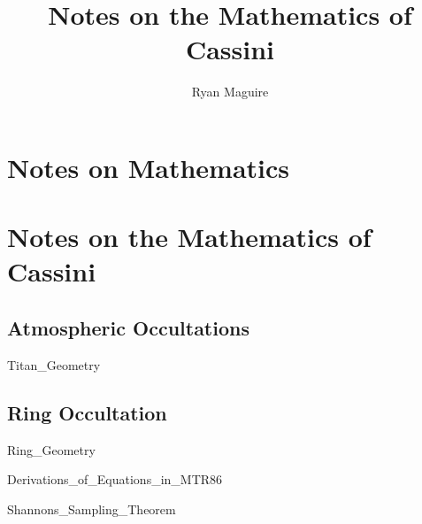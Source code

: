\documentclass[crop=false,class=book,oneside]{standalone}
\begin{document}
    \newif\ifresearchnotesosthemathematicsofcassini
    \ifx\ifresearch\undefined
        \title{Notes on the Mathematics of Cassini}
        \author{Ryan Maguire}
        \date{\vspace{-5ex}}
        \maketitle
        \tableofcontents
        \chapter*{Notes on Mathematics}
        \setcounter{chapter}{1}
    \else
        \chapter{Notes on the Mathematics of Cassini}
    \fi
    \section{Atmospheric Occultations}
        {Titan_Geometry}
    \section{Ring Occultation}
        {Ring_Geometry}
        
                  {Derivations_of_Equations_in_MTR86}
        
                  {Shannons_Sampling_Theorem}
\end{document}
